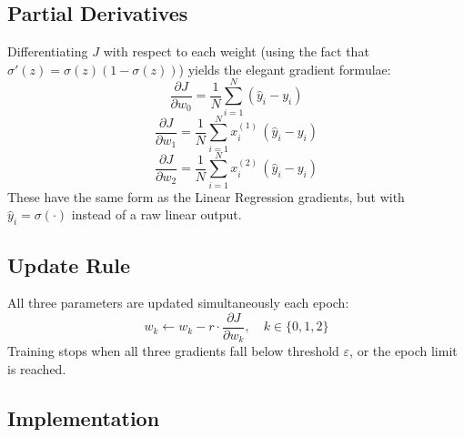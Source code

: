 \documentclass[12pt,a4paper]{article}
\begin{document}
\subsection{Partial Derivatives}

Differentiating $J$ with respect to each weight (using the fact that $\sigma'(z) = \sigma(z)(1-\sigma(z))$) yields the elegant gradient formulae:
\[
    \frac{\partial J}{\partial w_0} = \frac{1}{N} \sum_{i=1}^{N} (\hat{y}_i - y_i)
\]
\[
    \frac{\partial J}{\partial w_1} = \frac{1}{N} \sum_{i=1}^{N} x_i^{(1)}\,(\hat{y}_i - y_i)
\]
\[
    \frac{\partial J}{\partial w_2} = \frac{1}{N} \sum_{i=1}^{N} x_i^{(2)}\,(\hat{y}_i - y_i)
\]
These have the same form as the Linear Regression gradients, but with $\hat{y}_i = \sigma(\cdot)$ instead of a raw linear output.

\subsection{Update Rule}

All three parameters are updated simultaneously each epoch:
\[
    w_k \leftarrow w_k - r \cdot \frac{\partial J}{\partial w_k}, \quad k \in \{0,1,2\}
\]
Training stops when all three gradients fall below threshold $\varepsilon$, or the epoch limit is reached.

\subsection{Implementation}
\end{document}
